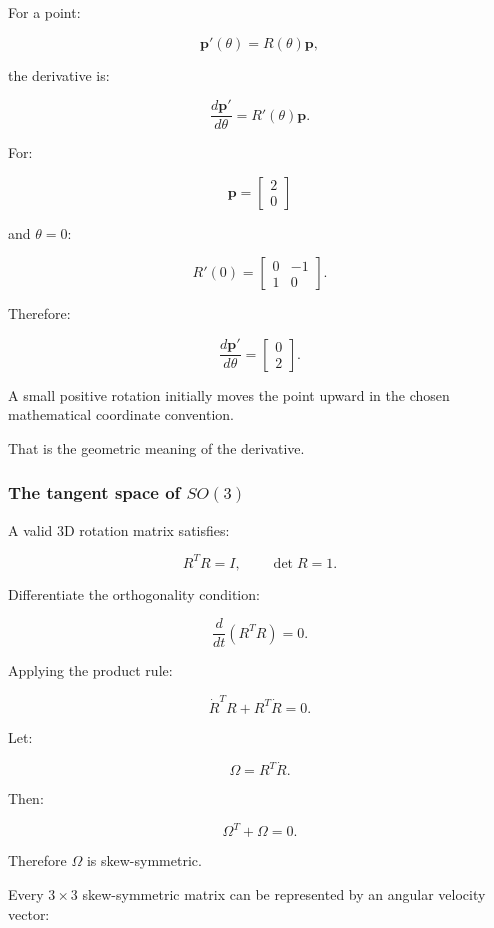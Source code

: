For a point:

\[
\mathbf p'(\theta)=R(\theta)\mathbf p,
\]

the derivative is:

\[
\boxed{ \frac{d\mathbf p'}{d\theta} = R'(\theta)\mathbf p }.
\]

For:

\[
\mathbf p= \begin{bmatrix} 2\\0 \end{bmatrix}
\]

and \(\theta=0\):

\[
R'(0)= \begin{bmatrix} 0&-1\\ 1&0 \end{bmatrix}.
\]

Therefore:

\[
\frac{d\mathbf p'}{d\theta} = \begin{bmatrix} 0\\2 \end{bmatrix}.
\]

A small positive rotation initially moves the point upward in the chosen mathematical coordinate convention.

That is the geometric meaning of the derivative.

\subsubsection{\texorpdfstring{The tangent space of \(SO(3)\)}{The tangent space of SO(3)}}\label{02-foundations-ii-ch027-the-tangent-space-of-so3}

\hypertarget{02-foundations-ii-ch027-the-tangent-space-of-so3}{}

A valid 3D rotation matrix satisfies:

\[
R^TR=I, \qquad \det R=1.
\]

Differentiate the orthogonality condition:

\[
\frac d{dt}(R^TR)=0.
\]

Applying the product rule:

\[
\dot R^TR+R^T\dot R=0.
\]

Let:

\[
\Omega=R^T\dot R.
\]

Then:

\[
\Omega^T+\Omega=0.
\]

Therefore \(\Omega\) is skew-symmetric.

Every \(3\times3\) skew-symmetric matrix can be represented by an angular velocity vector:

